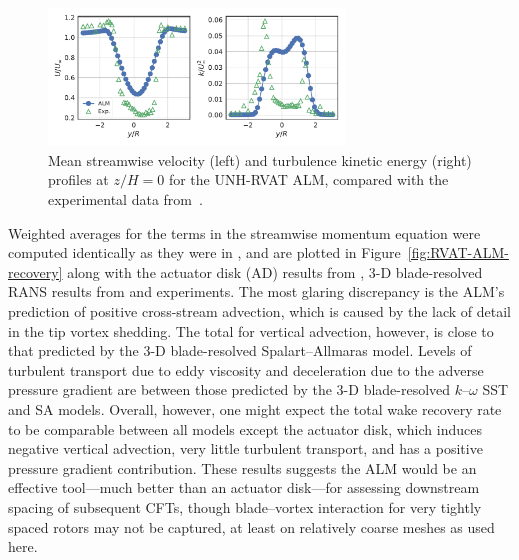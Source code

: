 \documentclass[times]{weauth}
\begin{document}
\begin{figure}
    \centering

    \includegraphics[width=0.7\textwidth]{RVAT-ALM_wake-profiles}

    \caption{Mean streamwise velocity (left) and turbulence kinetic energy
        (right) profiles at $z/H=0$ for the UNH-RVAT ALM, compared with the
        experimental data from~\cite{Bachant2016-RVAT-Re-dep}.}

    \label{fig:RVAT-ALM-profiles}
\end{figure}

Weighted averages for the terms in the streamwise momentum equation were
computed identically as they were in \cite{Bachant2015-JoT,Bachant2016-BR-CFD},
and are plotted in Figure~\ref{fig:RVAT-ALM-recovery} along with the actuator
disk (AD) results from \cite{Bachant2015-JoT}, 3-D blade-resolved RANS results
from \cite{Bachant2016-BR-CFD} and experiments. The most glaring discrepancy is
the ALM's prediction of positive cross-stream advection, which is caused by the
lack of detail in the tip vortex shedding. The total for vertical advection,
however, is close to that predicted by the 3-D blade-resolved Spalart--Allmaras
model. Levels of turbulent transport due to eddy viscosity and deceleration due
to the adverse pressure gradient are between those predicted by the 3-D
blade-resolved $k$--$\omega$ SST and SA models. Overall, however, one might
expect the total wake recovery rate to be comparable between all models except
the actuator disk, which induces negative vertical advection, very little
turbulent transport, and has a positive pressure gradient contribution. These
results suggests the ALM would be an effective tool---much better than an
actuator disk---for assessing downstream spacing of subsequent CFTs, though
blade--vortex interaction for very tightly spaced rotors may not be captured, at
least on relatively coarse meshes as used here.
\end{document}
